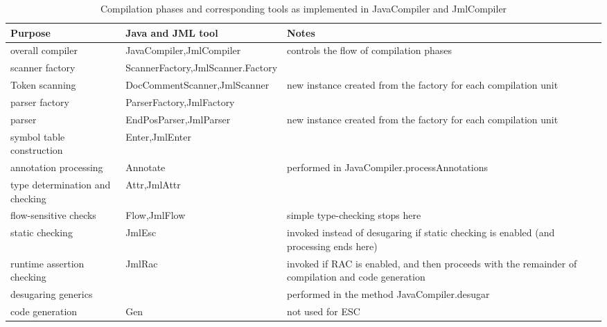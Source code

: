 \documentclass{report}%
\begin{document}
\begin{table}
\begin{tabularx}{\textwidth}{|p{1.5in}|p{1.5in}|X|}

\hline
Purpose & Java and JML tool &  Notes \\
\hline
overall compiler & JavaCompiler,\newline JmlCompiler & controls the flow of compilation phases \\
\hline
scanner factory & ScannerFactory,\newline JmlScanner.Factory  & \\
\hline
Token scanning & DocCommentScanner,\newline JmlScanner &  new instance created from the factory for each compilation unit \\
\hline
parser factory & ParserFactory,\newline JmlFactory  & \\
\hline
parser & EndPosParser,\newline JmlParser & new instance created from the factory for each compilation unit \\
\hline
symbol table construction & Enter,\newline JmlEnter & \\
\hline
annotation processing & Annotate & performed in JavaCompiler.processAnnotations\\
\hline
type determination and checking & Attr,\newline JmlAttr & \\
\hline
flow-sensitive checks & Flow,\newline JmlFlow & simple type-checking stops here \\
\hline
\hline
static checking & \hspace{.1in} \newline JmlEsc & invoked instead of desugaring if static checking is enabled (and processing ends here) \\
\hline
\hline
runtime assertion checking & \hspace*{.1in}\newline JmlRac & invoked if RAC is enabled, and then proceeds with the remainder of compilation and code generation \\
\hline
desugaring generics & & performed in the method JavaCompiler.desugar \\
\hline
code generation & Gen & not used for ESC \\
\hline


\end{tabularx}
\caption{Compilation phases and corresponding tools as implemented in JavaCompiler and JmlCompiler}
\label{Tools1}
\end{table}
\end{document}
